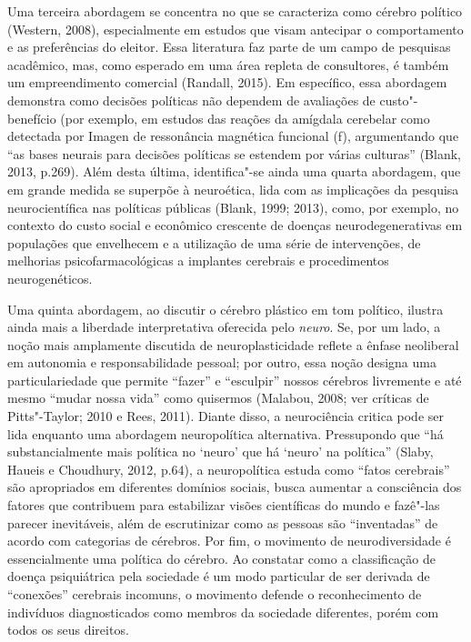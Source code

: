 Uma terceira abordagem se concentra no que se caracteriza como cérebro
político (Western, 2008), especialmente em estudos que visam antecipar o
comportamento e as preferências do eleitor. Essa literatura faz parte de
um campo de pesquisas acadêmico, mas, como esperado em uma área repleta
de consultores, é também um empreendimento comercial (Randall, 2015). Em
específico, essa abordagem demonstra como decisões políticas não
dependem de avaliações de custo"-benefício (por exemplo, em estudos das
reações da amígdala cerebelar como detectada por Imagen de ressonância
magnética funcional (f), argumentando que ``as bases neurais para
decisões políticas se estendem por várias culturas'' (Blank, 2013,
p.269). Além desta última, identifica"-se ainda uma quarta abordagem, que
em grande medida se superpõe à neuroética, lida com as implicações da
pesquisa neurocientífica nas políticas públicas (Blank, 1999; 2013),
como, por exemplo, no contexto do custo social e econômico crescente de
doenças neurodegenerativas em populações que envelhecem e a utilização
de uma série de intervenções, de melhorias psicofarmacológicas a
implantes cerebrais e procedimentos neurogenéticos.

Uma quinta abordagem, ao discutir o cérebro plástico em tom político,
ilustra ainda mais a liberdade interpretativa oferecida pelo
\emph{neuro}. Se, por um lado, a noção mais amplamente discutida de
neuroplasticidade reflete a ênfase neoliberal em autonomia e
responsabilidade pessoal; por outro, essa noção designa uma
particulariedade que permite ``fazer'' e ``esculpir'' nossos cérebros
livremente e até mesmo ``mudar nossa vida'' como quisermos (Malabou,
2008; ver críticas de Pitts"-Taylor; 2010 e Rees, 2011). Diante disso, a
neurociência critica pode ser lida enquanto uma abordagem neuropolítica
alternativa. Pressupondo que ``há substancialmente mais política no
`neuro' que há `neuro' na política'' (Slaby, Haueis e Choudhury, 2012,
p.64), a neuropolítica estuda como ``fatos cerebrais'' são apropriados
em diferentes domínios sociais, busca aumentar a consciência dos fatores
que contribuem para estabilizar visões científicas do mundo e fazê"-las
parecer inevitáveis, além de escrutinizar como as pessoas são
``inventadas'' de acordo com categorias de cérebros. Por fim, o
movimento de neurodiversidade é essencialmente uma política do cérebro.
Ao constatar como a classificação de doença psiquiátrica pela sociedade
é um modo particular de ser derivada de ``conexões'' cerebrais incomuns,
o movimento defende o reconhecimento de indivíduos diagnosticados como
membros da sociedade diferentes, porém com todos os seus direitos.

